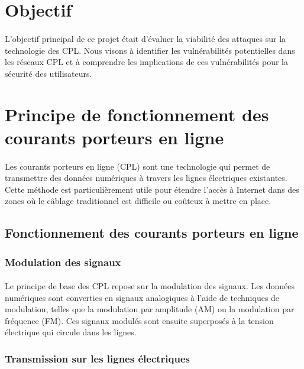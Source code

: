 \documentclass[a4paper,twocolumn]{report}
\begin{document}
\section{Objectif}
\paragraph{} L'objectif principal de ce projet était d'évaluer la viabilité des
attaques sur la technologie des CPL. Nous visons à identifier les vulnérabilités
potentielles dans les réseaux CPL et à comprendre les implications de ces vulnérabilités
pour la sécurité des utilisateurs.

\section{Principe de fonctionnement des courants porteurs en ligne}
\paragraph{} Les courants porteurs en ligne (CPL) sont une technologie qui permet
de transmettre des données numériques à travers les lignes électriques existantes.
Cette méthode est particulièrement utile pour étendre l'accès à Internet dans
des zones où le câblage traditionnel est difficile ou coûteux à mettre en place.

\subsection{Fonctionnement des courants porteurs en ligne}

\subsubsection{Modulation des signaux}
\paragraph{} Le principe de base des CPL repose sur la modulation des signaux.
Les données numériques sont converties en signaux analogiques à l'aide de techniques
de modulation, telles que la modulation par amplitude (AM) ou la modulation par fréquence (FM).
Ces signaux modulés sont ensuite superposés à la tension électrique qui circule dans les lignes.

\subsubsection{Transmission sur les lignes électriques}
\end{document}
